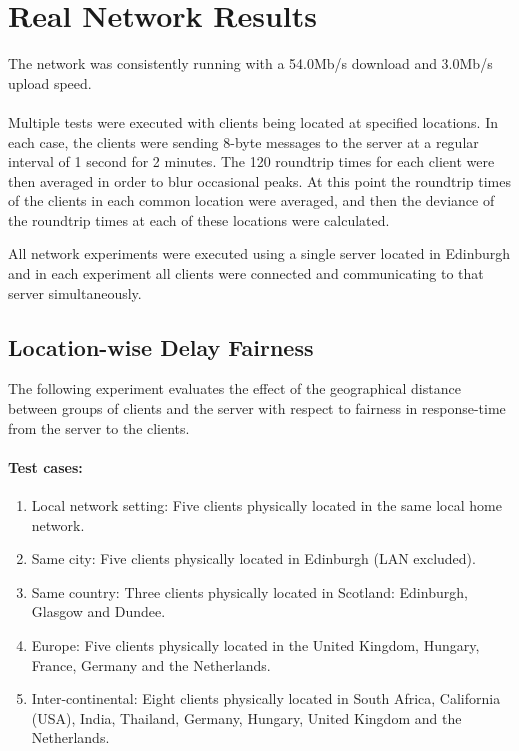\documentclass[bsc,frontabs,twoside,singlespacing,parskip,deptreport]{infthesis}     %
\begin{document}
\section{Real Network Results}
The network was consistently running with a 54.0Mb/s download and 3.0Mb/s upload speed.
\paragraph*{}Multiple tests were executed with clients being located at specified locations. In each case, the clients were sending 8-byte messages to the server at a regular interval of 1 second for 2 minutes. The 120 roundtrip times for each client were then averaged in order to blur occasional peaks. At this point the roundtrip times of the clients in each common location were averaged, and then the deviance of the roundtrip times at each of these locations were calculated.

All network experiments were executed using a single server located in Edinburgh and in each experiment all clients were connected and communicating to that server simultaneously.

\subsection{Location-wise Delay Fairness}
The following experiment evaluates the effect of the geographical distance between groups of clients and the server with respect to fairness in response-time from the server to the clients.

\paragraph*{Test cases:}
\begin{enumerate}
\item Local network setting: Five clients physically located in the same local home network.

\item Same city: Five clients physically located in Edinburgh (LAN excluded).

\item Same country: Three clients physically located in Scotland: Edinburgh, Glasgow and Dundee.

\item Europe: Five clients physically located in the United Kingdom, Hungary, France, Germany and the Netherlands.

\item Inter-continental: Eight clients physically located in South Africa, California (USA), India, Thailand, Germany, Hungary, United Kingdom and the Netherlands.

\end{enumerate}
\end{document}
